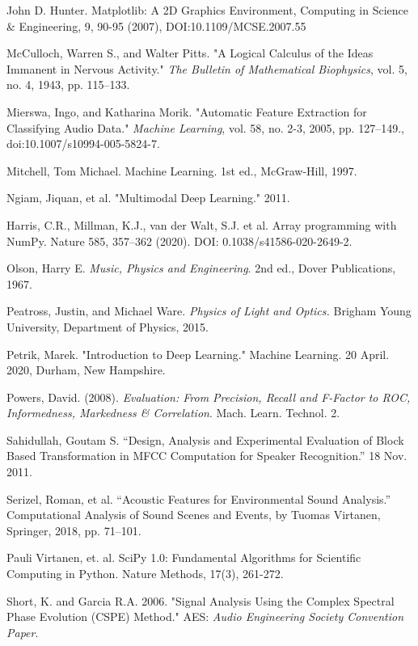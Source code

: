 \documentclass[12pt,letterpaper]{article}
\begin{document}
\begin{thebibliography}{9}
John D. Hunter. Matplotlib: A 2D Graphics Environment, Computing in Science & Engineering, 9, 90-95 (2007), DOI:10.1109/MCSE.2007.55

McCulloch, Warren S., and Walter Pitts. "A Logical Calculus of the Ideas Immanent in Nervous Activity." \textit{The Bulletin of Mathematical Biophysics}, vol. 5, no. 4, 1943, pp. 115–133.

Mierswa, Ingo, and Katharina Morik. "Automatic Feature Extraction for Classifying Audio Data." \textit{Machine Learning}, vol. 58, no. 2-3, 2005, pp. 127–149., doi:10.1007/s10994-005-5824-7.

Mitchell, Tom Michael. Machine Learning. 1st ed., McGraw-Hill, 1997.

Ngiam, Jiquan, et al. "Multimodal Deep Learning." 2011. 

Harris, C.R., Millman, K.J., van der Walt, S.J. et al. Array programming with NumPy. Nature 585, 357–362 (2020). DOI: 0.1038/s41586-020-2649-2. 

Olson, Harry E. \textit{Music, Physics and Engineering}. 2nd ed., Dover Publications, 1967.

Peatross, Justin, and Michael Ware. \textit{Physics of Light and Optics.} Brigham Young University, Department of Physics, 2015.

Petrik, Marek. "Introduction to Deep Learning." Machine Learning. 20 April. 2020, Durham, New Hampshire.

Powers, David. (2008). \textit{Evaluation: From Precision, Recall and F-Factor to ROC, Informedness, Markedness \& Correlation}. Mach. Learn. Technol. 2. 

Sahidullah, Goutam S. “Design, Analysis and Experimental Evaluation of Block Based Transformation in MFCC Computation for Speaker Recognition.” 18 Nov. 2011. 

Serizel, Roman, et al. “Acoustic Features for Environmental Sound Analysis.” Computational Analysis of Sound Scenes and Events, by Tuomas Virtanen, Springer, 2018, pp. 71–101. 

Pauli Virtanen, et. al. SciPy 1.0: Fundamental Algorithms for Scientific Computing in Python. Nature Methods, 17(3), 261-272.

Short, K. and Garcia R.A. 2006. "Signal Analysis Using the Complex Spectral Phase Evolution (CSPE) Method." AES: \textit{Audio Engineering Society Convention Paper}.


\end{thebibliography}
\end{document}
